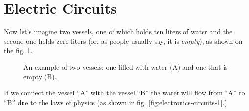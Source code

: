 \documentclass[../sparc.tex]{subfiles}
\begin{document}
\section{Electric Circuits}


Now let's imagine two vessels, one of which holds ten liters of water and the
second one holds zero liters (or, as people usually say, it is \emph{empty}), as
shown on the fig. \ref{fig:electronics-circuits-0}.

\begin{figure}[ht]
  \centering
  \caption{An example of two vessels: one filled with water (A) and one that is
    empty (B).}
  \label{fig:electronics-circuits-0}
\end{figure}

If we connect the vessel ``A'' with the vessel ``B'' the water will flow from
``A'' to ``B'' due to the laws of physics (as shown in fig.
\ref{fig:electronics-circuits-1}.)
\end{document}
